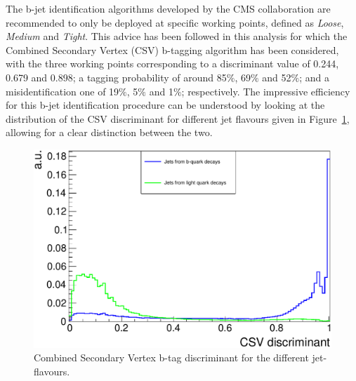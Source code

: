 The b-jet identification algorithms developed by the CMS collaboration are recommended to only be deployed at specific working points, defined as \textit{Loose}, \textit{Medium} and \textit{Tight}. This advice has been followed in this analysis for which the Combined Secondary Vertex (CSV) b-tagging algorithm has been considered, with the three working points corresponding to a discriminant value of 0.244, 0.679 and 0.898; a tagging probability of around 85$\%$, 69$\%$ and 52$\%$; and a misidentification one of 19$\%$, 5$\%$ and 1$\%$; respectively.
The impressive efficiency for this b-jet identification procedure can be understood by looking at the distribution of the CSV discriminant for different jet flavours given in Figure~\ref{fig::CSVDiscr}, allowing for a clear distinction between the two.
\begin{figure}[h!t]
 \centering
 \includegraphics[width = 0.85 \textwidth]{Chapters/Chapter4_EvtSel/Figures/CSVDiscr_LightAndBJets.pdf}
 \caption{Combined Secondary Vertex b-tag discriminant for the different jet-flavours.} \label{fig::CSVDiscr}
\end{figure}


